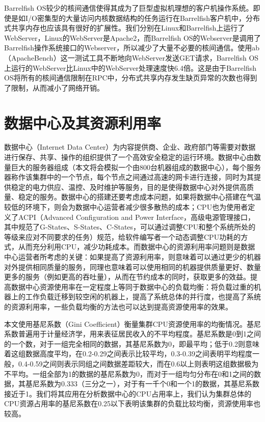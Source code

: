 Barrelfish OS较少的核间通信使得其成为了巨型虚拟机理想的客户机操作系统。即使是如I/O密集型的大量访问内核数据结构的任务运行在Barrelfish客户机中，分布式共享内存也应该具有很好的扩展性。我们分别在Linux和Barrelfish上运行了WebServer，Linux的WebServer是Apache2，而Barrelfish OS的Webserver是调用了Barrelfish操作系统接口的Webserver，所以减少了大量不必要的核间通信。使用ab（ApacheBench）\cite{ab}这一测试工具不断地向WebServer发送GET请求，Barrelfish OS上运行的WebServer比Linux中的WebServer处理速度快6.4倍\cite{giantvm}。这是由于Barrelfish OS将所有的核间通信限制在RPC中，分布式共享内存发生缺页异常的次数也得到了限制，从而减小了网络开销。

\section{数据中心及其资源利用率}
数据中心（Internet Data Center）为内容提供商、企业、政府部门等需要对数据进行保存、共享、操作的组织提供了一个高效安全稳定的运行环境。数据中心由数量巨大的服务器组成（本文将会模拟一个由800台机器组成的数据中心），每个服务器称作该集群中的一个节点，每个节点之间通过高速的网卡进行连接，同时为其提供稳定的电力供应、温控、及时维护等服务，目的是使得数据中心对外提供高质量、稳定的服务。数据中心的搭建还要考虑成本问题，如果将数据中心搭建在气温较低的环境下，则会为数据中心运营者减少很多散热的成本；CPU也为使用者定义了ACPI（Advanced Configuration and Power Interface，高级电源管理接口，其中规范了G-States、S-States、C-States，可以通过调整CPU和整个系统所处的等级来应对不同要求的任务）规范，给软件编写者一个动态调整CPU功耗的方式，从而充分利用CPU，减少功耗成本。而数据中心的资源利用率问题则是数据中心运营者所考虑的关键：如果提高了资源利用率，则意味着可以通过更少的机器对外提供相同质量的服务，同理也意味着可以使用相同的机器提供质量更好、数量更多的服务（例如更高的吞吐量），从而在节约成本的同时，获取更多的效益。提高数据中心资源使用率在一定程度上等同于数据中心的负载均衡：将负载过重的机器上的工作负载迁移到较空闲的机器上，提高了系统总体的并行度，也提高了系统的资源利用率，一些负载均衡的方法也可以达到提高资源使用率的效果。

本文使用基尼系数（Gini Coefficient）\cite{gini}衡量集群CPU资源使用率的均衡情况。基尼系数普遍用于计量经济学，用来表征居民收入的不平均程度。基尼系数是0到1之间的一个数，对于一组完全相同的数据，其基尼系数为0，即最平均；低于0.2则意味着这组数据高度平均，在0.2-0.29之间表示比较平均，0.3-0.39之间表明平均程度一般，0.4-0.59之间则表示同组之间数据差距较大，而在0.6以上则表明这组数据极为不平均。一组全部为1的数据的基尼系数为0，而对于一组均匀分布在0和1之间的数据，其基尼系数为0.333（三分之一），对于有一千个0和一个1的数据，其基尼系数接近于1。我们将其应用在分析数据中心的CPU占用率上，我们认为集群总体的CPU资源占用率的基尼系数在0.25以下表明该集群的负载比较均衡，资源使用率也较高。

